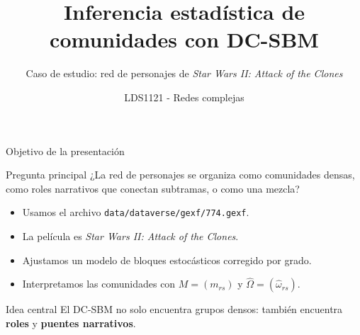 \documentclass[aspectratio=169,11pt]{beamer}
\title[DC-SBM Star Wars II]{Inferencia estadística de comunidades con DC-SBM}
\subtitle{Caso de estudio: red de personajes de \emph{Star Wars II: Attack of the Clones}}
\author{LDS1121 - Redes complejas}
\date{}
\newcommand{\Omhat}{\hat\Omega}
\newcommand{\what}{\hat\omega}
\begin{document}
\begin{frame}
  \titlepage
\end{frame}

\begin{frame}{Objetivo de la presentación}
\begin{block}{Pregunta principal}
¿La red de personajes se organiza como comunidades densas, como roles narrativos que conectan subtramas, o como una mezcla?
\end{block}

\vspace{0.3cm}

\begin{itemize}
    \item Usamos el archivo \texttt{data/dataverse/gexf/774.gexf}.
    \item La película es \emph{Star Wars II: Attack of the Clones}.
    \item Ajustamos un modelo de bloques estocásticos corregido por grado.
    \item Interpretamos las comunidades con $M=(m_{rs})$ y $\Omhat=(\what_{rs})$.
\end{itemize}

\vspace{0.25cm}
\begin{alertblock}{Idea central}
El DC-SBM no solo encuentra grupos densos: también encuentra \textbf{roles} y \textbf{puentes narrativos}.
\end{alertblock}
\end{frame}
\end{document}
